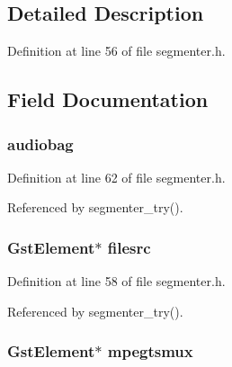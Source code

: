 \subsection{\-Detailed \-Description}


\-Definition at line 56 of file segmenter.\-h.



\subsection{\-Field \-Documentation}
\hypertarget{struct__transcoder__data_a27c753df9dd609802e4649f4be7e64e7}{
\subsubsection[{audiobag}]{ {\bf audiobag}}}\label{struct__transcoder__data_a27c753df9dd609802e4649f4be7e64e7}


\-Definition at line 62 of file segmenter.\-h.



\-Referenced by segmenter\-\_\-try().

\hypertarget{struct__transcoder__data_a650b27f093557fcea9f53f432c7724cf}{
\subsubsection[{filesrc}]{\setlength{\rightskip}{0pt plus 5cm}\-Gst\-Element$\ast$ {\bf filesrc}}}\label{struct__transcoder__data_a650b27f093557fcea9f53f432c7724cf}


\-Definition at line 58 of file segmenter.\-h.



\-Referenced by segmenter\-\_\-try().

\hypertarget{struct__transcoder__data_aa67a91cfc1bc02fc307178ef4f35df14}{
\subsubsection[{mpegtsmux}]{\setlength{\rightskip}{0pt plus 5cm}\-Gst\-Element$\ast$ {\bf mpegtsmux}}}\label{struct__transcoder__data_aa67a91cfc1bc02fc307178ef4f35df14}



